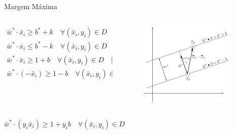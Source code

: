 \documentclass{beamer}
\begin{document}
\begin{frame}{Margem Máxima}
\begin{columns}
    \begin{column}{.59\textwidth}
        \begin{equation}
            \begin{split}
                \bar{w}^*\cdot\bar{x}_i \ge b^*+k \quad \forall (\bar{x}_i,y_i)\in D \quad | \quad y_i=+1 \\
                \bar{w}^*\cdot\bar{x}_i \le b^*-k \quad \forall (\bar{x}_i,y_i)\in D \quad | \quad y_i=-1 \\
                \bar{w}^*\cdot\bar{x}_i \ge 1+b \quad \forall (\bar{x}_i,y_i)\in D \quad | \quad y_i=+1 \\
                \bar{w}^*\cdot(-\bar{x}_i) \ge 1-b \quad \forall (\bar{x}_i,y_i)\in D \quad | \quad y_i=-1
            \end{split}
        \end{equation}
    \end{column}
    \begin{column}{.39\textwidth}
    \begin{figure}
      \centering
      \includegraphics[width=0.9\textwidth]{svm_4.png}
    \end{figure}
    \end{column}
\end{columns}
\centering
$\bar{w}^*\cdot(y_i\bar{x}_i) \ge 1+y_i b \quad \forall (\bar{x}_i,y_i)\in D$
\end{frame}
\end{document}
